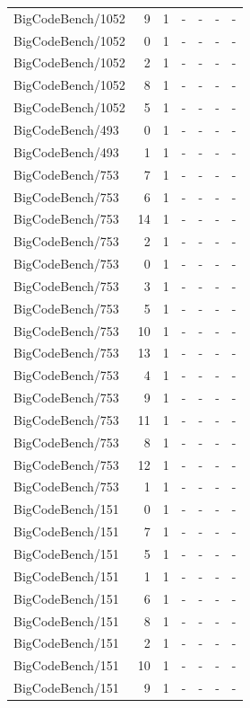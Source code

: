 \begin{longtable}{lrrllll}
BigCodeBench/1052 & 9 & 1 & - & - & - & - \\
BigCodeBench/1052 & 0 & 1 & - & - & - & - \\
BigCodeBench/1052 & 2 & 1 & - & - & - & - \\
BigCodeBench/1052 & 8 & 1 & - & - & - & - \\
BigCodeBench/1052 & 5 & 1 & - & - & - & - \\
BigCodeBench/493 & 0 & 1 & - & - & - & - \\
BigCodeBench/493 & 1 & 1 & - & - & - & - \\
BigCodeBench/753 & 7 & 1 & - & - & - & - \\
BigCodeBench/753 & 6 & 1 & - & - & - & - \\
BigCodeBench/753 & 14 & 1 & - & - & - & - \\
BigCodeBench/753 & 2 & 1 & - & - & - & - \\
BigCodeBench/753 & 0 & 1 & - & - & - & - \\
BigCodeBench/753 & 3 & 1 & - & - & - & - \\
BigCodeBench/753 & 5 & 1 & - & - & - & - \\
BigCodeBench/753 & 10 & 1 & - & - & - & - \\
BigCodeBench/753 & 13 & 1 & - & - & - & - \\
BigCodeBench/753 & 4 & 1 & - & - & - & - \\
BigCodeBench/753 & 9 & 1 & - & - & - & - \\
BigCodeBench/753 & 11 & 1 & - & - & - & - \\
BigCodeBench/753 & 8 & 1 & - & - & - & - \\
BigCodeBench/753 & 12 & 1 & - & - & - & - \\
BigCodeBench/753 & 1 & 1 & - & - & - & - \\
BigCodeBench/151 & 0 & 1 & - & - & - & - \\
BigCodeBench/151 & 7 & 1 & - & - & - & - \\
BigCodeBench/151 & 5 & 1 & - & - & - & - \\
BigCodeBench/151 & 1 & 1 & - & - & - & - \\
BigCodeBench/151 & 6 & 1 & - & - & - & - \\
BigCodeBench/151 & 8 & 1 & - & - & - & - \\
BigCodeBench/151 & 2 & 1 & - & - & - & - \\
BigCodeBench/151 & 10 & 1 & - & - & - & - \\
BigCodeBench/151 & 9 & 1 & - & - & - & - \\

\end{longtable}
